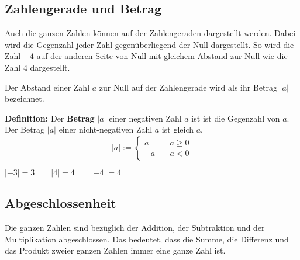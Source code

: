 \subsection{Zahlengerade und Betrag}

Auch die ganzen Zahlen können auf der Zahlengeraden dargestellt werden. Dabei wird die Gegenzahl jeder Zahl gegenüberliegend der Null dargestellt. So wird die Zahl $-4$ auf der anderen Seite von Null mit gleichem Abstand zur Null wie die Zahl $4$ dargestellt.
\begin{center}
\end{center}

Der Abstand einer Zahl $a$ zur Null auf der Zahlengerade wird als ihr Betrag $|a|$ bezeichnet.

\textbf{Definition:} Der \textbf{Betrag} $|a|$ einer negativen Zahl $a$ ist ist die Gegenzahl von $a$. Der Betrag $|a|$ einer nicht-negativen Zahl $a$ ist gleich $a$.
\[
  |a| := \begin{cases}
    a &\quad a \geq 0 \\
    -a &\quad a < 0
  \end{cases}
\]
\begin{example}
  $|-3| = 3 \qquad |4| = 4 \qquad |-4| = 4$
\end{example}

\subsection{Abgeschlossenheit}

Die ganzen Zahlen sind bezüglich der Addition, der Subtraktion und der Multiplikation abgeschlossen. Das bedeutet, dass die Summe, die Differenz und das Produkt zweier ganzen Zahlen immer eine ganze Zahl ist.

